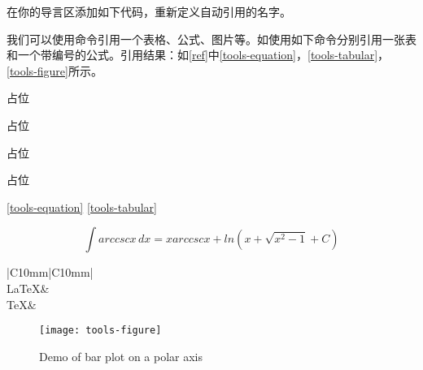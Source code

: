 在你的导言区添加如下代码，重新定义自动引用的名字。
\begin{latex}{}
\end{latex}

我们可以使用命令引用一个表格、公式、图片等。如使用如下命令分别引用一张表和一个带编号的公式。引用结果：如\autoref{ref}中\autoref{tools-equation}，\autoref{tools-tabular}，\autoref{tools-figure}所示。

占位

占位

占位

占位


\begin{latex}{}
\ref{tools-equation}
\ref{tools-tabular}
\end{latex}

\begin{equation}\label{tools-equation}
\int arccscx\,dx=xarccscx+ln(x+\sqrt{x^2-1}+C)
\end{equation}

\begin{table}[!ht]
\begin{center}
	\caption{\TeX 家族标识符}
	\label{tools-tabular}
	\begin{tabular}{|C{10mm}|C{10mm}|}
		\hline
		\\
		\hline
		\LaTeX & \LaTeXe\\
		\hline
		\TeX & \XeLaTeX\\
		\hline
	\end{tabular}
\end{center}
\end{table}

\begin{figure}[!ht]
	\begin{center}
		\texttt{[image: tools-figure]}
		\caption{Demo of bar plot on a polar axis}
		\label{tools-figure}
	\end{center}
\end{figure}



